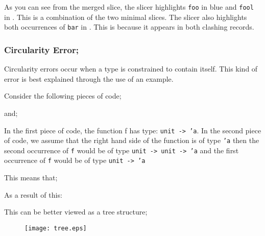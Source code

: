 \documentclass{report}
\begin{document}
\begin{itemize}
As you can see from the merged slice, the slicer highlights
\texttt{foo} in blue and \texttt{fool} in
\tesEndPointOne. This is a combination of the two minimal slices. The slicer
also highlights both occurrences of \texttt{bar} in
\tesEndPointOne. This is because it appears in both clashing records.


\newpage


\subsubsection{Circularity Error;}

\subitem Circularity errors occur when a type is constrained to
contain itself. This kind of error is best explained through the use
of an example.

Consider the following pieces of code;


and;


In the first piece of code, the function f has type:
\texttt{unit -> 'a}.  In the second piece of code, we assume
that the right hand side of the function is of type \texttt{'a}
then the second occurrence of \texttt{f} would be of type
\texttt{unit -> unit -> 'a} and the first occurrence of
\texttt{f} would be of type \texttt{unit -> 'a}

This means that;


As a result of this:


This can be better viewed as a tree structure;

\begin{figure}[!h]
\begin{center}
\texttt{[image: tree.eps]}
\end{center}
\end{figure}




\end{itemize}
\end{document}
